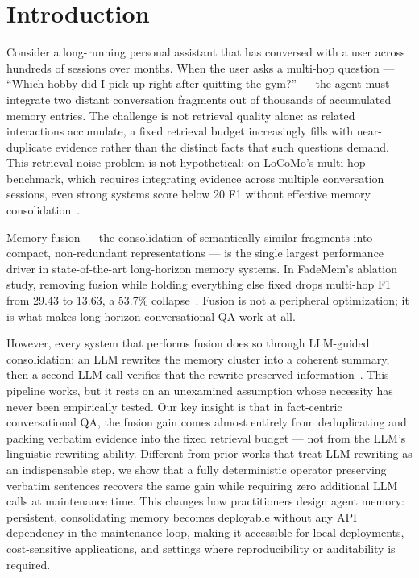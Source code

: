 \section{Introduction}
\label{sec:intro}

Consider a long-running personal assistant that has conversed with a user across hundreds of sessions over months.
When the user asks a multi-hop question --- ``Which hobby did I pick up right after quitting the gym?'' --- the agent must integrate two distant conversation fragments out of thousands of accumulated memory entries.
The challenge is not retrieval quality alone: as related interactions accumulate, a fixed retrieval budget increasingly fills with near-duplicate evidence rather than the distinct facts that such questions demand.
This retrieval-noise problem is not hypothetical: on LoCoMo's multi-hop benchmark, which requires integrating evidence across multiple conversation sessions, even strong systems score below 20 F1 without effective memory consolidation~\citep{Maharana2024EvaluatingVL}.

Memory fusion --- the consolidation of semantically similar fragments into compact, non-redundant representations --- is the single largest performance driver in state-of-the-art long-horizon memory systems.
In FadeMem's ablation study, removing fusion while holding everything else fixed drops multi-hop F1 from 29.43 to 13.63, a 53.7\% collapse~\citep{Wei2026FadeMemBF}.
Fusion is not a peripheral optimization; it is what makes long-horizon conversational QA work at all.

However, every system that performs fusion does so through LLM-guided consolidation: an LLM rewrites the memory cluster into a coherent summary, then a second LLM call verifies that the rewrite preserved information~\citep{Wei2026FadeMemBF,chhikara2025mem0buildingproductionreadyai}.
This pipeline works, but it rests on an unexamined assumption whose necessity has never been empirically tested.
Our key insight is that in fact-centric conversational QA, the fusion gain comes almost entirely from deduplicating and packing verbatim evidence into the fixed retrieval budget --- not from the LLM's linguistic rewriting ability.
Different from prior works that treat LLM rewriting as an indispensable step, we show that a fully deterministic operator preserving verbatim sentences recovers the same gain while requiring zero additional LLM calls at maintenance time.
This changes how practitioners design agent memory: persistent, consolidating memory becomes deployable without any API dependency in the maintenance loop, making it accessible for local deployments, cost-sensitive applications, and settings where reproducibility or auditability is required.

